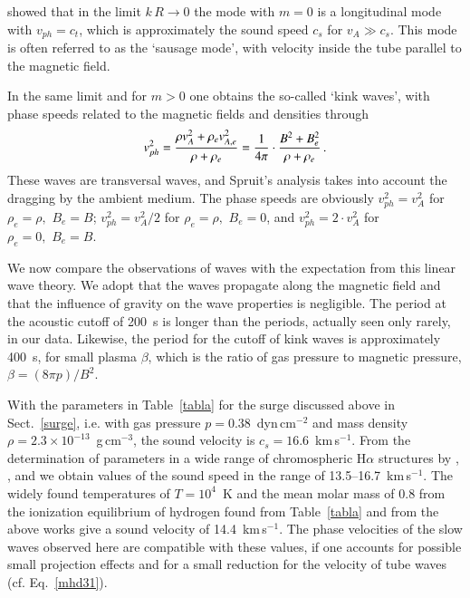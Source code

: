 \citet{1982SoPh...75....3S} showed that in the limit $k\,R\rightarrow0$ the mode with $m=0$ is a longitudinal mode with $v_{ph}=c_t$, which is {approximately} the sound speed $c_s$ for $v_A\gg c_s$. This mode is often referred to as the `sausage mode', with velocity inside the tube parallel to the magnetic field.

In the same limit and for $m>0$ one obtains the so-called `kink waves', with phase speeds related to the magnetic fields and densities through
\begin{equation}
v_{ph}^2={\rho v_A^2+\rho_e v_{A,e}^2\over\rho+\rho_e} = {1\over4\pi}\cdot{B^2+B_e^2\over\rho+\rho_e}\,.
\label{mhd32}
\end{equation}
These waves are transversal waves, and Spruit's \citeyearpar{1982SoPh...75....3S} analysis takes into account the dragging by the ambient medium. The phase speeds are obviously $v_{ph}^2=v_A^2$ for $\rho_e=\rho,\,\,B_e=B$; $v_{ph}^2=v_A^2/2$ for $\rho_e=\rho,\,\,B_e=0$, and $v_{ph}^2=2\cdot v_A^2$ for $\rho_e=0,\,\,B_e=B$.


We now compare the observations of waves with the expectation from this linear wave theory. We adopt that the waves propagate along the magnetic field and that the influence of gravity on the wave properties is {negligible}. The period at the acoustic cutoff of 200~s is longer than the periods, actually seen only rarely, in our data. Likewise, the period for the cutoff of kink waves \citep{spruit81,choudhuri93} is approximately 400~s, for small plasma $\beta$, which is the ratio of gas pressure to magnetic pressure, $\beta=(8\pi p)/B^2$.

With the parameters in Table~\ref{tabla} for the surge discussed above in Sect.~\ref{surge}, i.e. with gas pressure $p=0.38$~dyn\,cm$^{-2}$ and mass density $\rho=2.3\times10^{-13}$~g\,cm$^{-3}$, the sound velocity is $c_s=16.6$~km\,s$^{-1}$. From the determination of parameters in a wide range of chromospheric H$\alpha$ structures by \citet{tsiropoula97}, \citet{tsiropoula00}, and  \citet{2004A&A...424..279T} we obtain values of the sound speed in the range of 13.5--16.7~km\,s$^{-1}$. The widely found temperatures of $T=10^4$~K and the mean molar mass of 0.8 from the ionization equilibrium of hydrogen found from Table~\ref{tabla} and from the above works give a sound velocity of 14.4~km\,s$^{-1}$. The phase velocities of the slow waves observed here are compatible with these values, if one accounts for possible small projection effects and for a small reduction for the velocity of tube waves (cf. Eq.~\ref{mhd31}).

